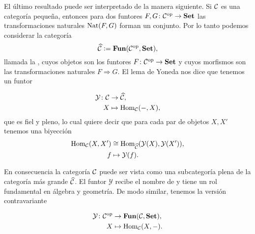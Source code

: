 \documentclass{article}
\numberwithin{equation}{section}
\theoremstyle{definition}
\begin{document}
El último resultado puede ser interpretado de la manera siguiente. Si
$\mathcal{C}$ es una categoría pequeña, entonces para dos funtores
$F,G\colon \mathcal{C}^\mathrm{op} \to \text{\bf Set}$ las transformaciones
naturales $\operatorname{Nat} (F,G)$ forman un conjunto. Por lo tanto podemos considerar la
categoría
$$\widehat{\mathcal{C}} \mathrel{\mathop:}= \text{\bf Fun} (\mathcal{C}^\mathrm{op}, \text{\bf Set}),$$
llamada la , cuyos objetos son
los funtores $F\colon \mathcal{C}^\mathrm{op} \to \text{\bf Set}$ y cuyos morfismos
son las transformaciones naturales $F\Rightarrow G$. El lema de Yoneda nos dice
que tenemos un funtor

\begin{align*}
  \mathcal{Y}\colon \mathcal{C} & \to \widehat{\mathcal{C}},\\
  X & \mapsto \operatorname{Hom}_\mathcal{C} (-,X),
\end{align*}
que es fiel y pleno, lo cual quiere decir que para cada par de objetos $X, X'$
tenemos una biyección
\begin{align*}
  \operatorname{Hom}_\mathcal{C} (X, X') & \cong \operatorname{Hom}_{\widehat{\mathcal{C}}} (\mathcal{Y} (X), \mathcal{Y} (X')),\\
  f & \mapsto \mathcal{Y} (f).
\end{align*}

En consecuencia la categoría $\mathcal{C}$ puede ser vista como una subcategoría
plena de la categoría más grande $\widehat{\mathcal{C}}$. El funtor $\mathcal{Y}$
recibe el nombre de  y tiene un rol fundamental en
álgebra y geometría. De modo similar, tenemos la versión contravariante

\begin{align*}
  \mathcal{Y}\colon \mathcal{C}^\mathrm{op} & \to \text{\bf Fun} (\mathcal{C}, \text{\bf Set}),\\
  X & \mapsto \operatorname{Hom}_\mathcal{C} (X,-).
\end{align*}
\end{document}
